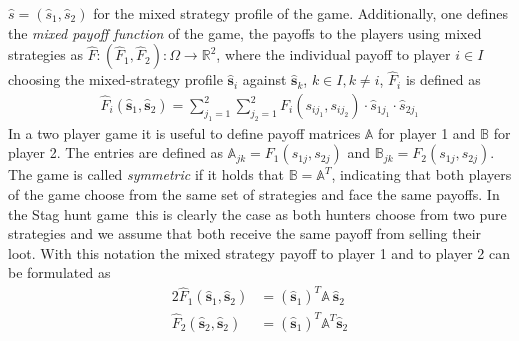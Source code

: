 \documentclass[12pt]{article}
\newcommand{\sthuga}{Stag hunt game}
\newcommand{\realnumb}{\mathbb{R}}
\newcommand{\stu}{s}
\newcommand{\pay}{F}
\newcommand{\sprob}{\hat{s}}
\newcommand{\svec}{\vec{\sprob}}
\renewcommand{\vec}{\mathbf}
\newcommand{\mixpay}{\hat{\pay}}
\newcommand{\mixstratspace}{\Omega}
\newcommand{\payma}{\mathbb{A}}
\begin{document}
$\sprob = \left(\sprob_1,\sprob_2\right)$ for the mixed strategy profile of 
the game. 
Additionally, one defines the \textit{mixed payoff function} of the game,
the payoffs to the players using mixed strategies as 
$\mixpay: (\mixpay_1,\mixpay_2): \mixstratspace \rightarrow \realnumb^2$, 
where the individual payoff to player $i \in I$ choosing the mixed-strategy 
profile $\svec_i$ against $\svec_k$,  $k \in I, k \neq i$, $\mixpay_i$ is 
defined as
\begin{align}
        \mixpay_i(\svec_1,\svec_2) = \sum_{j_{1}=1}^{2} \sum_{j_{2}=1}^{2} 
        \pay_{i}(\stu_{i{j_1}},\stu_{i{j_2}}) \cdot \sprob_{1j_1} \cdot 
        \sprob_{2j_1}
\end{align}
In a two player game it is useful to define payoff matrices $\payma$ for player
1 and $\mathbb{B}$ for player 2. The entries are defined as $\payma_{jk} = 
\pay_1(s_{1j},s_{2j})$ and $\mathbb{B}_{jk} = \pay_2(s_{1j},s_{2j})$. 
The game is called \textit{symmetric} if it holds that $\mathbb{B} = \payma^T$,
indicating that both players of the game choose from the same set of strategies
and face the same payoffs. In the \sthuga\ this is clearly the case as both
hunters choose from two pure strategies and we assume that both receive the
same payoff from selling their loot. 
With this notation the mixed strategy payoff to player 1 and to player 2 can be
formulated as
\begin{alignat}{2}
        \mixpay_1(\svec_1,\svec_2) &= (\svec_1)^T \payma \ \svec_2 \\
        \mixpay_2(\svec_2,\svec_2) &= (\svec_1)^T \payma^T \svec_2
   \end{alignat}
\end{document}
